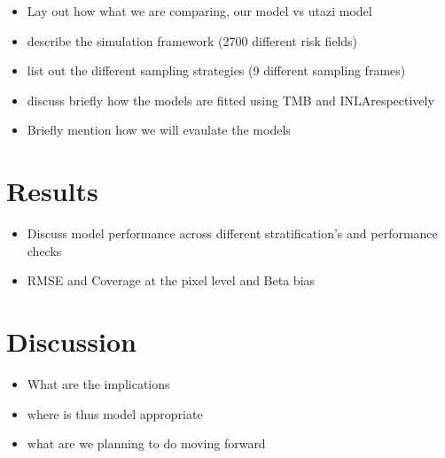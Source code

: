 \documentclass{article}
\begin{document}
\begin{itemize}
\item Lay out how what we are comparing, our model vs utazi model
\item describe the simulation framework (2700 different risk fields)
\item list out the different sampling strategies (9 different sampling frames)
\item discuss briefly how the models are fitted using TMB and INLArespectively
\item Briefly mention how we will evaulate the models
\end{itemize}

\section{Results}\label{results}

\begin{itemize}
\item  Discuss model performance across different stratification's and performance checks
\item RMSE and Coverage at the pixel level and Beta bias
\end{itemize}

\section{Discussion}\label{discussion}

\begin{itemize}
\item What are the implications
\item where is thus model appropriate
\item what are we planning to do moving forward
\end{itemize}

\newpage



\end{document}
